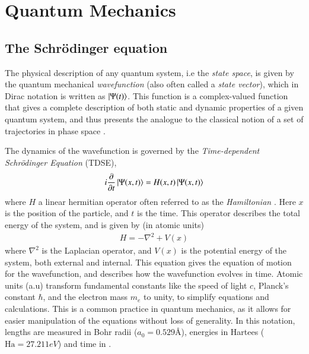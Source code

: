 \documentclass{subfiles}
\begin{document}
\section{Quantum Mechanics}
\subsection{The Schrödinger equation}
The physical description of any quantum system, i.e the \emph{state space}, is given by the quantum mechanical \emph{wavefunction} (also often called a \emph{state vector})\cite{nielsen2010quantum}, which in Dirac notation is written as $\ket{\Psi(t)}$. 
This function is a complex-valued function that gives a complete description of both static and dynamic properties of a given quantum system, and thus presents the analogue to the classical notion of a set of trajectories in phase space \cite{hochstuhl2014time}. 

The dynamics of the wavefunction is governed by the \emph{Time-dependent Schrödinger Equation} (TDSE),
\begin{equation}
    i\frac{\partial}{\partial t}\ket{\Psi(x, t)} = H(x,t)\ket{\Psi(x, t)}\label{eq:tdse}
\end{equation}
where $H$ a linear hermitian operator often referred to as the \emph{Hamiltonian} \cite{griffiths2018introduction, berera2021quantum}. Here $x$ is the position of the particle, and $t$ is the time. 
This operator describes the total energy of the system, and is given by (in atomic units)
\begin{align*}
    H = -\nabla^2 + V(x)
\end{align*}
where $\nabla^2$ is the Laplacian operator, and $V(x)$ is the potential energy of the system, both external and internal.
This equation gives the equation of motion for the wavefunction, and describes how the wavefunction evolves in time. Atomic units (a.u) transform fundamental constants like the speed of light $c$, Planck's constant $\hbar$, and the electron mass $m_e$ to unity, to simplify equations and calculations. This is a common practice in quantum mechanics, as it allows for easier manipulation of the equations without loss of generality. In this notation, lengths are measured in Bohr radii ($ a_0 = 0.529Å$), energies in Hartees ($ \text{Ha} = 27.211 eV$) and time in  \cite{szabo1996modern}.
\end{document}

